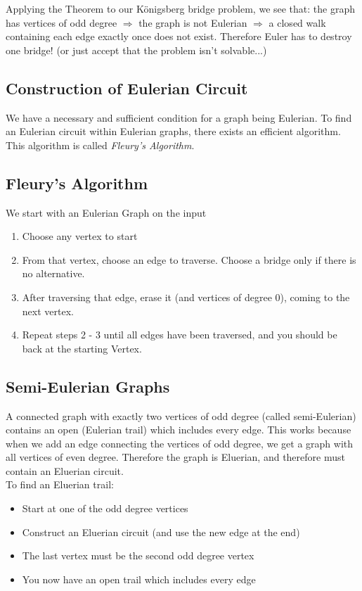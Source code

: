 Applying the Theorem to our K\"{o}nigsberg bridge problem, we see that: the graph has vertices of odd degree $\Rightarrow$ the graph is not Eulerian $\Rightarrow$ a closed walk containing each edge exactly once does not exist. Therefore Euler has to destroy one bridge! (or just accept that the problem isn't solvable...)

\subsection{Construction of Eulerian Circuit}
We have a necessary and sufficient condition for a graph being Eulerian. To find an Eulerian circuit within Eulerian graphs, there exists an efficient algorithm. This algorithm is called \textit{Fleury's Algorithm}. 

\subsection{Fleury's Algorithm}
We start with an Eulerian Graph on the input
\begin{enumerate}
    \item Choose any vertex to start
    \item From that vertex, choose an edge to traverse. Choose a bridge only if there is no alternative.
    \item After traversing that edge, erase it (and vertices of degree 0), coming to the next vertex.
    \item Repeat steps 2 - 3 until all edges have been traversed, and you should be back at the starting Vertex. 
\end{enumerate}

\subsection{Semi-Eulerian Graphs}
A connected graph with exactly two vertices of odd degree (called semi-Eulerian) contains an open (Eulerian trail) which includes every edge. This works because when we add an edge connecting the vertices of odd degree, we get a graph with all vertices of even degree. Therefore the graph is Eluerian, and therefore must contain an Eluerian circuit.\\

To find an Eluerian trail:
\begin{itemize}
    \item Start at one of the odd degree vertices
    \item Construct an Eluerian circuit (and use the new edge at the end)
    \item The last vertex must be the second odd degree vertex
    \item You now have an open trail which includes every edge
\end{itemize}

